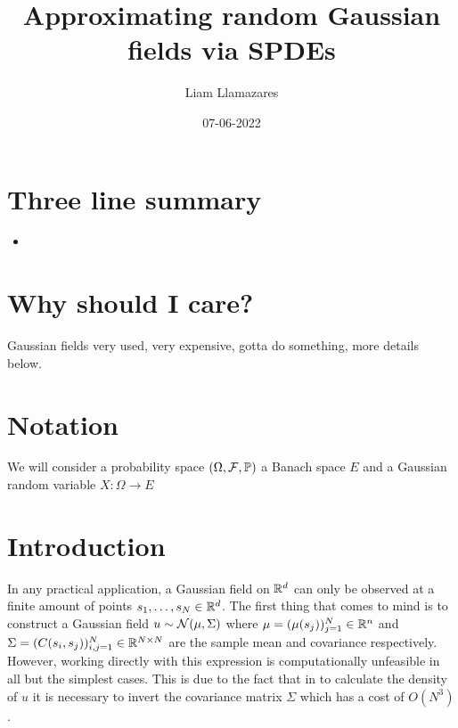 \documentclass[12pt]{article}
\begin{document}
\begin{CJK*}{UTF8}{gbsn}
	\title{Approximating random Gaussian fields via SPDEs}
	\author{Liam Llamazares}
	\date{07-06-2022}
	\maketitle
	\section{ Three line summary}
	\begin{itemize}
		\item
	\end{itemize}
	\section{Why should I care?}
	Gaussian fields very used, very expensive, gotta do something, more details below.
	\section{Notation}
	We will consider a probability space $(\Omega,\mathcal{F},\mathbb{P})$ a Banach space $E$ and a Gaussian random variable  $X:\Omega\to E$
	\section{Introduction}
	In any practical application, a Gaussian field on ${\mathbb R}^d$ can only be observed at a finite amount of points $s_1,\ldots,s_N\in {\mathbb R}^d$. The first thing that comes to mind is to construct a Gaussian field $u\sim \mathcal{N}(\mu ,\Sigma)$ where $\mu =(\mu(s_j))_{j=1}^N \in {\mathbb R}^n$ and $\Sigma=(C(s_i,s_j))_{i,j=1}^N \in {\mathbb R}^{N\times N}$ are the sample mean and covariance respectively.	 However, working directly with this expression is computationally unfeasible in all but the simplest cases. This is due to the fact that in to calculate the density of $u$ it is necessary to invert the  covariance matrix $\Sigma $ which has a cost of $O(N^3)$.

\end{CJK*}
\end{document}
